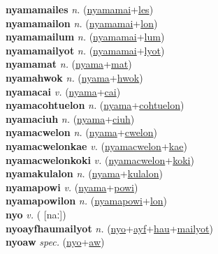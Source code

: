 \textbf{nyamamailes} \textit{n.} (\hyperref[nyamamai]{nyamamai}+\hyperref[les]{les})
 \label{nyamamailes} \\
\textbf{nyamamailon} \textit{n.} (\hyperref[nyamamai]{nyamamai}+\hyperref[lon]{lon})
 \label{nyamamailon} \\
\textbf{nyamamailum} \textit{n.} (\hyperref[nyamamai]{nyamamai}+\hyperref[lum]{lum})
 \label{nyamamailum} \\
\textbf{nyamamailyot} \textit{n.} (\hyperref[nyamamai]{nyamamai}+\hyperref[lyot]{lyot})
 \label{nyamamailyot} \\
\textbf{nyamamat} \textit{n.} (\hyperref[nyama]{nyama}+\hyperref[mat]{mat})
 \label{nyamamat} \\
\textbf{nyamahwok} \textit{n.} (\hyperref[nyama]{nyama}+\hyperref[hwok]{hwok})
 \label{nyamahwok} \\
\textbf{nyamacai} \textit{v.} (\hyperref[nyama]{nyama}+\hyperref[cai]{cai})
 \label{nyamacai} \\
\textbf{nyamacohtuelon} \textit{n.} (\hyperref[nyama]{nyama}+\hyperref[cohtuelon]{cohtuelon})
 \label{nyamacohtuelon} \\
\textbf{nyamaciuh} \textit{n.} (\hyperref[nyama]{nyama}+\hyperref[ciuh]{ciuh})
 \label{nyamaciuh} \\
\textbf{nyamacwelon} \textit{n.} (\hyperref[nyama]{nyama}+\hyperref[cwelon]{cwelon})
 \label{nyamacwelon} \\
\textbf{nyamacwelonkae} \textit{v.} (\hyperref[nyamacwelon]{nyamacwelon}+\hyperref[kae]{kae})
 \label{nyamacwelonkae} \\
\textbf{nyamacwelonkoki} \textit{v.} (\hyperref[nyamacwelon]{nyamacwelon}+\hyperref[koki]{koki})
 \label{nyamacwelonkoki} \\
\textbf{nyamakulalon} \textit{n.} (\hyperref[nyama]{nyama}+\hyperref[kulalon]{kulalon})
 \label{nyamakulalon} \\
\textbf{nyamapowi} \textit{v.} (\hyperref[nyama]{nyama}+\hyperref[powi]{powi})
 \label{nyamapowi} \\
\textbf{nyamapowilon} \textit{n.} (\hyperref[nyamapowi]{nyamapowi}+\hyperref[lon]{lon})
 \label{nyamapowilon} \\
\textbf{nyo} \textit{v.} ( [naː])
 \label{nyo} \\
\textbf{nyoayfhaumailyot} \textit{n.} (\hyperref[nyo]{nyo}+\hyperref[ayf]{ayf}+\hyperref[hau]{hau}+\hyperref[mailyot]{mailyot})
 \label{nyoayfhaumailyot} \\
\textbf{nyoaw} \textit{spec.} (\hyperref[nyo]{nyo}+\hyperref[aw]{aw})
